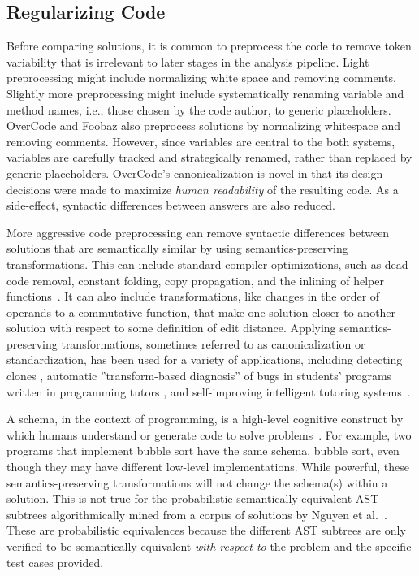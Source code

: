 \subsection{Regularizing Code}
Before comparing solutions, it is common to preprocess the code to remove token variability that is irrelevant to later stages in the analysis pipeline. Light preprocessing might include normalizing white space and removing comments. Slightly more preprocessing might include systematically renaming variable and method names, i.e., those chosen by the code author, to generic placeholders. OverCode and Foobaz also preprocess solutions by normalizing whitespace and removing comments. However, since variables are central to the both systems, variables are carefully tracked and strategically renamed, rather than replaced by generic placeholders. OverCode’s canonicalization is novel in that its design decisions were made to maximize {\it human readability} of the resulting code. As a side-effect, syntactic differences between answers are also reduced.


More aggressive code preprocessing can remove syntactic differences between solutions that are semantically similar by using semantics-preserving transformations. This can include standard compiler optimizations, such as dead code removal, constant folding, copy propagation, and the inlining of helper functions~\cite{rivers2015data}. It can also include transformations, like changes in the order of operands to a commutative function, that make one solution closer to another solution with respect to some definition of edit distance. Applying semantics-preserving transformations, sometimes referred to as canonicalization or standardization, has been used for a variety of applications, including detecting clones \cite{baxter,CCFinder}, automatic ''transform-based diagnosis'' of bugs in students' programs written in programming tutors \cite{xutransformation}, and self-improving intelligent tutoring systems~\cite{rivers2015data}. 

A schema, in the context of programming, is a high-level cognitive construct by which humans understand or generate code to solve problems~\cite{Soloway1984}. For example, two programs that implement bubble sort have the same schema, bubble sort, even though they may have different low-level implementations. While powerful, these semantics-preserving transformations will not change the schema(s) within a solution. This is not true for the probabilistic semantically equivalent AST subtrees algorithmically mined from a corpus of solutions by Nguyen et al.~\cite{codewebs}. These are probabilistic equivalences because the different AST subtrees are only verified to be semantically equivalent {\it with respect to} the problem and the specific test cases provided. 

